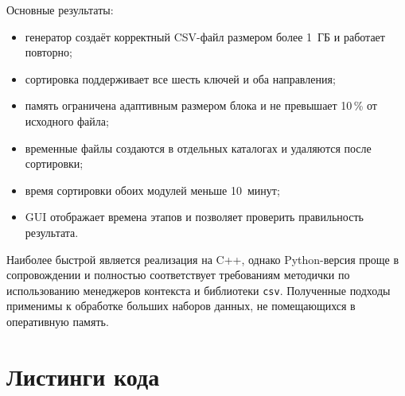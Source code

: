 \documentclass[oneside,a4paper,14pt]{extarticle}
\begin{document}
Основные результаты:
\begin{itemize}[leftmargin=*]
	\item генератор создаёт корректный CSV-файл размером более 1~ГБ и работает повторно;
	\item сортировка поддерживает все шесть ключей и оба направления;
	\item память ограничена адаптивным размером блока и не превышает 10\,\% от исходного файла;
	\item временные файлы создаются в отдельных каталогах и удаляются после сортировки;
	\item время сортировки обоих модулей меньше 10~минут;
	\item GUI отображает времена этапов и позволяет проверить правильность результата.
\end{itemize}

Наиболее быстрой является реализация на C++, однако Python-версия проще в сопровождении и полностью соответствует требованиям методички по использованию менеджеров контекста и библиотеки \texttt{csv}. Полученные подходы применимы к обработке больших наборов данных, не помещающихся в оперативную память.

\newpage
\section*{Листинги кода}










\end{document}
